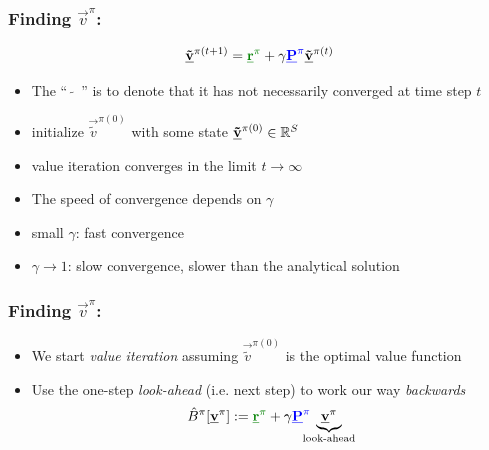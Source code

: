 \begin{frame}\frametitle{Finding $\vec v^\pi$:~\subsubsecname}

\begin{equation}
	\vec {\tilde v}^{\pi (t+1)} = {\color{reward}\vec r^\pi} 
		+ \gamma {\color{trans}\vec P^\pi} \vec {\tilde v}^{\pi (t)} 
\end{equation}

\begin{itemize}
\item 
The ``~$\tilde{}$~'' is to denote that it has not necessarily converged 
at time step $t$
\item initialize $\vec {\tilde v}^{\pi (0)}$ with some state $\underline{\mathbf{\tilde v}}^{\pi (0)} \in \mathbb{R}^{S}$
\item value iteration converges in the limit $t \rightarrow \infty$
\item The speed of convergence depends on $\gamma$
\end{itemize}


\pause 

\begin{itemize}
\item small $\gamma$: fast convergence
\item $\gamma \rightarrow 1$: slow convergence, slower than the analytical solution
\end{itemize}

\end{frame}


\begin{frame}\frametitle{Finding $\vec v^\pi$:~\subsubsecname}
    

\begin{itemize}
\item We start \emph{value iteration} assuming $\vec {\tilde v}^{\pi (0)}$ is the optimal value function
\item Use the one-step \emph{look-ahead} (i.e. next step) to work our way \emph{backwards}\\

	\begin{equation*}
		\hat B^\pi[\vec v^\pi] :=
		{\color{reward}\vec r^\pi} 
			+ \gamma {\color{trans}\vec P^\pi} \kern-1.7ex \underbrace{\vec v^\pi}_{\text{look-ahead}}
	\end{equation*}
\end{itemize}

\end{frame}

